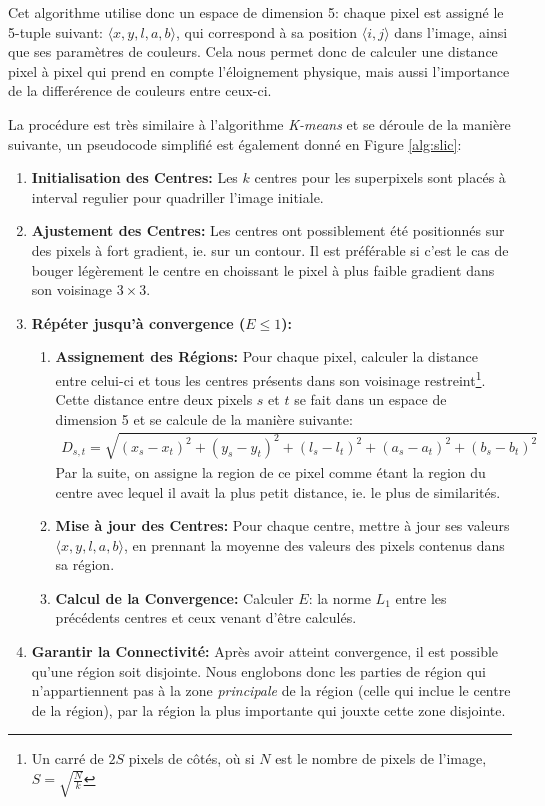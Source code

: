 \documentclass[12pt]{article}
\begin{document}
Cet algorithme utilise donc un espace de dimension 5: chaque pixel est assign\'e le 5-tuple suivant: $\langle x, y, l, a, b \rangle$,
qui correspond \`a sa position $\langle i, j\rangle$ dans l'image, ainsi que ses param\`etres de couleurs.
Cela nous permet donc de calculer une distance pixel \`a pixel qui prend en compte l'\'eloignement physique,
mais aussi l'importance de la differ\'erence de couleurs entre ceux-ci.

La proc\'edure est tr\`es similaire \`a l'algorithme \textit{K-means} et se d\'eroule de la mani\`ere suivante, un pseudocode simplifi\'e est \'egalement donn\'e en Figure \ref{alg:slic}:

\begin{enumerate}
  \item \textbf{Initialisation des Centres:} Les $k$ centres pour les superpixels sont plac\'es \`a interval regulier pour quadriller l'image initiale.
  \item \textbf{Ajustement des Centres:} Les centres ont possiblement \'et\'e positionn\'es sur des pixels \`a fort gradient, ie. sur un contour.
        Il est pr\'ef\'erable si c'est le cas de bouger l\'eg\`erement le centre en choissant le pixel \`a plus faible gradient dans son voisinage $3\times 3$.
  \item \textbf{R\'ep\'eter jusqu'\`a convergence ($E \leq 1$):}
        \begin{enumerate}
          \item \textbf{Assignement des R\'egions:} Pour chaque pixel, calculer la distance entre celui-ci et tous les centres pr\'esents dans son voisinage restreint\footnote{Un carr\'e de $2S$ pixels de c\^ot\'es, o\`u si $N$ est le nombre de pixels de l'image, $S=\sqrt{\frac{N}{k}}$}.
                Cette distance entre deux pixels $s$ et $t$ se fait dans un espace de dimension 5 et se calcule de la mani\`ere suivante:
                \begin{align*}
                  D_{s,t} = \sqrt{(x_s - x_t)^2 + (y_s - y_t)^2 + (l_s - l_t)^2 + (a_s - a_t)^2 +  (b_s - b_t)^2}
                \end{align*}
                Par la suite, on assigne la region de ce pixel comme \'etant la region du centre avec lequel il avait la plus petit distance,
                ie. le plus de similarit\'es.
          \item \textbf{Mise \`a jour des Centres:} Pour chaque centre, mettre \`a jour ses valeurs $\langle x, y, l, a, b\rangle$,
                en prennant la moyenne des valeurs des pixels contenus dans sa r\'egion.
          \item \textbf{Calcul de la Convergence:} Calculer $E$: la norme $L_1$ entre les pr\'ec\'edents centres et ceux venant d'\^etre calcul\'es.
        \end{enumerate}
  \item \textbf{Garantir la Connectivit\'e:} Apr\`es avoir atteint convergence, il est possible qu'une r\'egion soit disjointe.
        Nous englobons donc les parties de r\'egion qui n'appartiennent pas \`a la zone \textit{principale} de la r\'egion (celle qui inclue le centre de la r\'egion),
        par la r\'egion la plus importante qui jouxte cette zone disjointe.
\end{enumerate}
\end{document}
